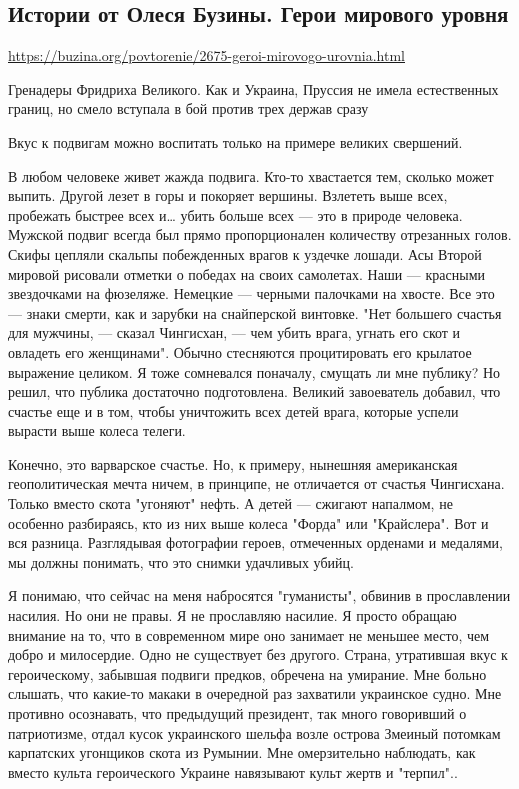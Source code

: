  
 

\subsection{Истории от Олеся Бузины. Герои мирового уровня}
\label{sec:saint_russia.buzina.1.geroi_mirovogo_urovnja}

\url{https://buzina.org/povtorenie/2675-geroi-mirovogo-urovnia.html}

Гренадеры Фридриха Великого. Как и Украина, Пруссия не имела естественных
границ, но смело вступала в бой против трех держав сразу

Вкус к подвигам можно воспитать только на примере великих свершений.

В любом человеке живет жажда подвига. Кто-то хвастается тем, сколько может
выпить. Другой лезет в горы и покоряет вершины. Взлететь выше всех, пробежать
быстрее всех и… убить больше всех --- это в природе человека. Мужской подвиг
всегда был прямо пропорционален количеству отрезанных голов. Скифы цепляли
скальпы побежденных врагов к уздечке лошади. Асы Второй мировой рисовали
отметки о победах на своих самолетах. Наши --- красными звездочками на фюзеляже.
Немецкие --- черными палочками на хвосте. Все это --- знаки смерти, как и зарубки
на снайперской винтовке. "Нет большего счастья для мужчины, --- сказал Чингисхан,
--- чем убить врага, угнать его скот и овладеть его женщинами". Обычно стесняются
процитировать его крылатое выражение целиком. Я тоже сомневался поначалу,
смущать ли мне публику? Но решил, что публика достаточно подготовлена. Великий
завоеватель добавил, что счастье еще и в том, чтобы уничтожить всех детей
врага, которые успели вырасти выше колеса телеги.

Конечно, это варварское счастье. Но, к примеру, нынешняя американская
геополитическая мечта ничем, в принципе, не отличается от счастья Чингисхана.
Только вместо скота "угоняют" нефть. А детей --- сжигают напалмом, не особенно
разбираясь, кто из них выше колеса "Форда" или "Крайслера". Вот и вся разница.
Разглядывая фотографии героев, отмеченных орденами и медалями, мы должны
понимать, что это снимки удачливых убийц.

Я понимаю, что сейчас на меня набросятся "гуманисты", обвинив в прославлении
насилия. Но они не правы. Я не прославляю насилие. Я просто обращаю внимание на
то, что в современном мире оно занимает не меньшее место, чем добро и
милосердие. Одно не существует без другого. Страна, утратившая вкус к
героическому, забывшая подвиги предков, обречена на умирание. Мне больно
слышать, что какие-то макаки в очередной раз захватили украинское судно. Мне
противно осознавать, что предыдущий президент, так много говоривший о
патриотизме, отдал кусок украинского шельфа возле острова Змеиный потомкам
карпатских угонщиков скота из Румынии. Мне омерзительно наблюдать, как вместо
культа героического Украине навязывают культ жертв и "терпил"..


